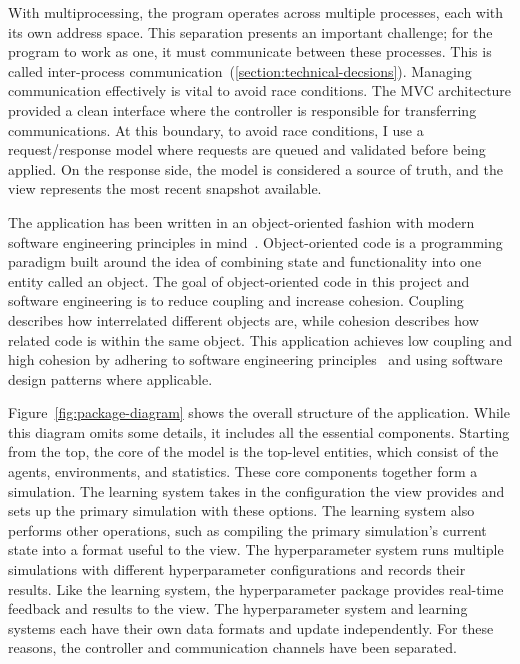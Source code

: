 \documentclass[]{final_report}
\begin{document}
With multiprocessing, the program operates across multiple processes, each with its own address space. This separation presents an important challenge; for the program to work as one, it must communicate between these processes. This is called inter-process communication~(\ref{section:technical-decsions}). Managing communication effectively is vital to avoid race conditions. The MVC architecture provided a clean interface where the controller is responsible for transferring communications. At this boundary, to avoid race conditions, I use a request/response model where requests are queued and validated before being applied. On the response side, the model is considered a source of truth, and the view represents the most recent snapshot available.  

The application has been written in an object-oriented fashion with modern software engineering principles in mind~\cite{van2008software}. Object-oriented code is a programming paradigm built around the idea of combining state and functionality into one entity called an object. The goal of object-oriented code in this project and software engineering is to reduce coupling and increase cohesion. Coupling describes how interrelated different objects are, while cohesion describes how related code is within the same object. This application achieves low coupling and high cohesion by adhering to software engineering principles~\cite{softwareEngineringPrinciples} and using software design patterns where applicable.

Figure~\ref{fig:package-diagram} shows the overall structure of the application. While this diagram omits some details, it includes all the essential components. Starting from the top, the core of the model is the top-level entities, which consist of the agents, environments, and statistics. These core components together form a simulation. The learning system takes in the configuration the view provides and sets up the primary simulation with these options. The learning system also performs other operations, such as compiling the primary simulation's current state into a format useful to the view. The hyperparameter system runs multiple simulations with different hyperparameter configurations and records their results. Like the learning system, the hyperparameter package provides real-time feedback and results to the view. The hyperparameter system and learning systems each have their own data formats and update independently. For these reasons, the controller and communication channels have been separated. 
\end{document}
